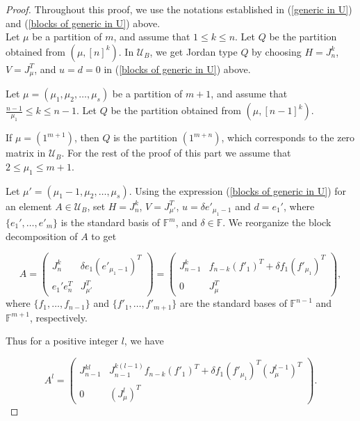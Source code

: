 \documentclass[11pt]{amsproc}
\newcommand{\U}{\mathcal{U}}
\begin{document}
\begin{proof}
Throughout this proof, we use the notations established in (\ref{generic in U}) and  (\ref{blocks of generic in U}) above.
\\

  Let $\mu$ be a partition of $m$, and assume that $1\leq k\leq n$. Let $Q$ be the partition obtained from $\left(\mu, [n]^k\right)$. In $\U_B$, we get Jordan type $Q$ by choosing $H=J_n^k$, $V=J_\mu^T$, and $u=d=0$ in (\ref{blocks of generic in U}) above.

 Let $\mu=(\mu_1, \mu_2, \ldots, \mu_s)$ be a partition of $m+1$, and assume that $\frac{n-1}{\mu_1}\leq k\leq n-1$. Let $Q$ be the partition obtained from $\left(\mu, [n-1]^k\right)$.

If $\mu=\left(1^{m+1}\right)$, then $Q$ is the partition $\left(1^{m+n}\right)$, which corresponds to the zero matrix in $\U_B$.  For the rest of the proof of this part we assume that $2\leq \mu_1\leq m+1$.

Let $\mu'=(\mu_1-1,\mu_2, \ldots, \mu_s)$. Using the expression (\ref{blocks of generic in U}) for an element $A\in \U_B$, set $H=J_n^k$, $V=J_{\mu'}^T$, $u=\delta e'_{\mu_1-1}$ and $d=e_1'$, where $\{e_1', \ldots, e'_m\}$ is the standard basis of $\mathbb{F}^m$, and $\delta\in \mathbb{F}$. We reorganize the block decomposition of $A$ to get

\[A=\left( 
\begin{array}{c|c}
  J_n^k  & \delta e_1\left(e'_{\mu_1-1}\right)^T \\
  \hline
  e_1'e_n^T   & J_{\mu'}^T
\end{array}
\right)= 
\left( 
\begin{array}{c|c}
  J_{n-1}^k & f_{n-k}\left(f'_1\right)^T +\delta f_1\left(f'_{\mu_1}\right)^T\\
 \hline
  0 & J_\mu^T
\end{array}
\right),\]
%
where $\{f_1, \ldots, f_{n-1}\}$ and $\{f'_1, \ldots, f'_{m+1}\}$ are the standard bases of $\mathbb{F}^{n-1}$ and $\mathbb{F}^{m+1}$, respectively. 

Thus for a positive integer $l$, we have 

\[A^l=\left(
\begin{array}{c|c}
    J_{n-1}^{kl} & J_{n-1}^{k(l-1)}f_{n-k}(f'_1)^T+\delta f_1\left(f'_{\mu_1}\right)^T (J_\mu^{l-1})^{T}\\
    \hline
    0 & \left(J^l_{\mu }\right)^T
\end{array}
\right).
\]


\end{proof}
\end{document}
